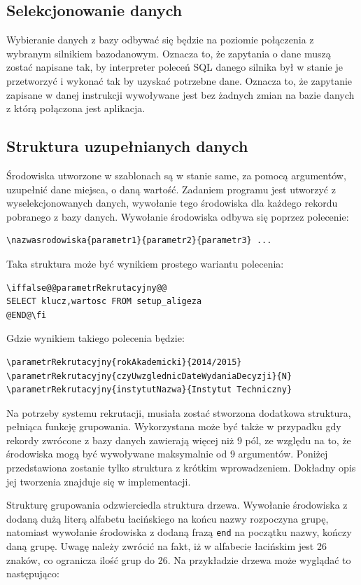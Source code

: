 \subsection{Selekcjonowanie danych}

Wybieranie danych z bazy odbywać się będzie na poziomie połączenia z wybranym silnikiem bazodanowym. Oznacza to, że zapytania o dane muszą zostać napisane tak, by interpreter poleceń SQL danego silnika był w stanie je przetworzyć i wykonać tak by uzyskać potrzebne dane. Oznacza to, że zapytanie zapisane w danej instrukcji wywoływane jest bez żadnych zmian na bazie danych z którą połączona jest aplikacja.

\subsection{Struktura uzupełnianych danych}

Środowiska utworzone w szablonach są w stanie same, za pomocą argumentów, uzupełnić dane miejsca, o daną wartość. Zadaniem programu jest utworzyć z wyselekcjonowanych danych, wywołanie tego środowiska dla każdego rekordu pobranego z bazy danych. Wywołanie środowiska odbywa się poprzez polecenie:
\begin{lstlisting}
\nazwasrodowiska{parametr1}{parametr2}{parametr3} ...
\end{lstlisting}

Taka struktura może być wynikiem prostego wariantu polecenia:
\begin{lstlisting}
\iffalse@@parametrRekrutacyjny@@
SELECT klucz,wartosc FROM setup_aligeza
@END@\fi
\end{lstlisting}
Gdzie wynikiem takiego polecenia będzie:
\begin{lstlisting}
\parametrRekrutacyjny{rokAkademicki}{2014/2015}
\parametrRekrutacyjny{czyUwzglednicDateWydaniaDecyzji}{N}
\parametrRekrutacyjny{instytutNazwa}{Instytut Techniczny}
\end{lstlisting}

Na potrzeby systemu rekrutacji, musiała zostać stworzona dodatkowa struktura, pełniąca funkcję grupowania. Wykorzystana może być także w przypadku gdy rekordy zwrócone z bazy danych zawierają więcej niż 9 pól, ze względu na to, że środowiska mogą być wywoływane maksymalnie od 9 argumentów. Poniżej przedstawiona zostanie tylko struktura z krótkim wprowadzeniem. Dokładny opis jej tworzenia znajduje się w implementacji.

Strukturę grupowania odzwierciedla struktura drzewa. Wywołanie środowiska z dodaną dużą literą alfabetu łacińskiego na końcu nazwy rozpoczyna grupę, natomiast wywołanie środowiska z dodaną frazą \texttt{end} na początku nazwy, kończy daną grupę. Uwagę należy zwrócić na fakt, iż w alfabecie łacińskim jest 26 znaków, co ogranicza ilość grup do 26. Na przykładzie drzewa może wyglądać to następująco:

